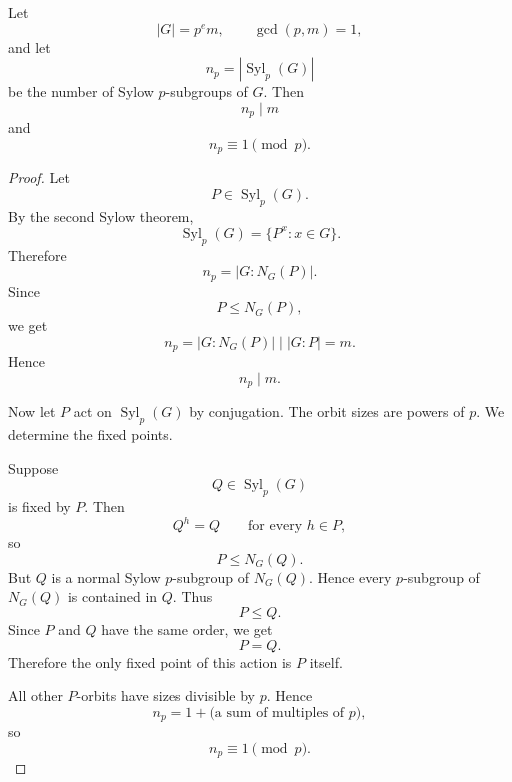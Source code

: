 \begin{theorem}\label{thm:third-sylow}
Let
\[
    |G|=p^e m,
    \qquad
    \gcd(p,m)=1,
\]
and let
\[
    n_p=|\operatorname{Syl}_p(G)|
\]
be the number of Sylow $p$-subgroups of $G$. Then
\[
    n_p\mid m
\]
and
\[
    n_p\equiv 1\pmod p.
\]
\end{theorem}

\begin{proof}
Let
\[
    P\in\operatorname{Syl}_p(G).
\]
By the second Sylow theorem,
\[
    \operatorname{Syl}_p(G)
    =
    \{P^x:x\in G\}.
\]
Therefore
\[
    n_p
    =
    |G:N_G(P)|.
\]
Since
\[
    P\leq N_G(P),
\]
we get
\[
    n_p=|G:N_G(P)|\mid |G:P|=m.
\]
Hence
\[
    n_p\mid m.
\]

Now let $P$ act on $\operatorname{Syl}_p(G)$ by conjugation. The orbit sizes are powers of $p$. We determine the fixed points.

Suppose
\[
    Q\in \operatorname{Syl}_p(G)
\]
is fixed by $P$. Then
\[
    Q^h=Q
    \qquad
    \text{for every }h\in P,
\]
so
\[
    P\leq N_G(Q).
\]
But $Q$ is a normal Sylow $p$-subgroup of $N_G(Q)$. Hence every $p$-subgroup of $N_G(Q)$ is contained in $Q$. Thus
\[
    P\leq Q.
\]
Since $P$ and $Q$ have the same order, we get
\[
    P=Q.
\]
Therefore the only fixed point of this action is $P$ itself.

All other $P$-orbits have sizes divisible by $p$. Hence
\[
    n_p
    =
    1+\text{(a sum of multiples of }p),
\]
so
\[
    n_p\equiv 1\pmod p.
\]
\end{proof}

